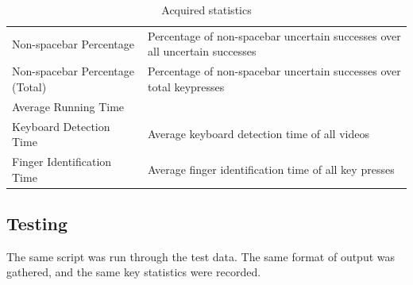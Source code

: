 \documentclass{report}
\begin{document}
\begin{table}[H]
\begin{tabular}{ p{} p{} }
		Non-spacebar Percentage                  & Percentage of non-spacebar uncertain successes over all uncertain successes             \\
		Non-spacebar Percentage \newline (Total) & Percentage of non-spacebar uncertain successes over total keypresses
		\\[0.25cm]
		\midrule
		Average Running Time                                                                                                               \\
		\midrule
		Keyboard Detection Time                  & Average keyboard detection time of all videos                                           \\
		Finger Identification Time               & Average finger identification time of all key presses                                   \\
		\bottomrule
	\end{tabular}
	\caption{\label{tab:acquired-stats}Acquired statistics}
\end{table}

\subsection{Testing}
The same script was run through the test data. The same format of output was
gathered, and the same key statistics were recorded.





\end{document}
